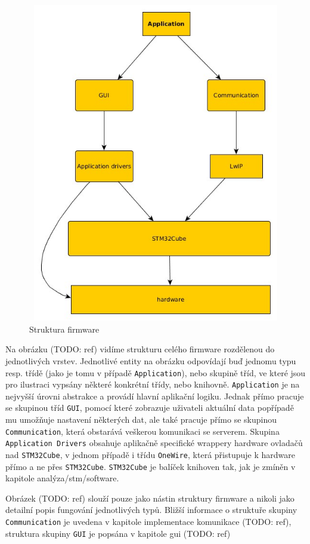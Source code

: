 \begin{figure}[tbh]\centering
\includegraphics[width=140mm, height=140mm]{../diagrams/stm_fw_struktura.jpg}
\caption{Struktura firmware}
\label{stm-fw-struktura}
\end{figure}

Na obrázku (TODO: ref) vidíme strukturu celého firmware rozdělenou do jednotlivých vrstev.
Jednotlivé entity na obrázku odpovídají buď jednomu typu resp. třídě (jako je tomu v případě \texttt{Application}),
nebo skupině tříd, ve které jsou pro ilustraci vypsány některé konkrétní třídy, nebo knihovně.
\texttt{Application} je na nejvyšší úrovni abstrakce a provádí hlavní aplikační logiku.
Jednak přímo pracuje se skupinou tříd \texttt{GUI}, pomocí které zobrazuje uživateli aktuální data
popřípadě mu umožňuje nastavení některých dat, ale také pracuje přímo se skupinou \texttt{Communication},
která obstarává veškerou komunikaci se serverem.
Skupina \texttt{Application Drivers} obsahuje aplikačně specifické wrappery hardware ovladačů nad
\texttt{STM32Cube}, v jednom případě i třídu \texttt{OneWire}, která přistupuje k hardware přímo
a ne přes \texttt{STM32Cube}.
\texttt{STM32Cube} je balíček knihoven tak, jak je zmíněn v kapitole analýza/stm/software.

Obrázek (TODO: ref) slouží pouze jako nástin struktury firmware a nikoli jako detailní popis fungování jednotlivých
typů.
Bližší informace o struktuře skupiny \texttt{Communication} je uvedena v kapitole implementace komunikace (TODO: ref),
struktura skupiny \texttt{GUI} je popsána v kapitole gui (TODO: ref)

